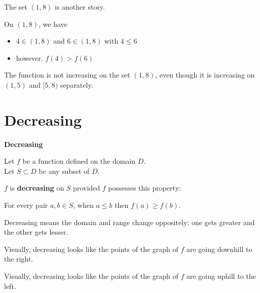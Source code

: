 \documentclass{ximera}
\begin{document}
The set $(1,8)$ is another story.


On $(1,8)$, we have 

\begin{itemize}
\item $4 \in (1,8)$  and  $6 \in (1,8)$  with $4 \leq 6$ \\

\item however, $f(4) > f(6)$
\end{itemize}


The function is not increasing on the set $(1,8)$, even though it is increasing on $(1,5)$ and $[5,8)$ separately. \\














\section{Decreasing}



\begin{definition} \textbf{\textcolor{green!50!black}{Decreasing}} 


Let $f$ be a function defined on the domain $D$. \\
Let $S \subset D$ be any subset of $D$.

$f$ is \textbf{decreasing} on $S$ provided $f$ possesses this property:  


\begin{center}
For every pair $a, b \in S$, when $a \leq b$ then $f(a) \geq f(b)$.
\end{center}

\end{definition}




\begin{idea}
Decreasing means the domain and range change oppositely: one gets greater and the other gets lesser.
\end{idea}


\begin{observation}
Visually, decreasing looks like the points of the graph of $f$ are going downhill to the right.
\end{observation}

\begin{observation}
Visually, decreasing looks like the points of the graph of $f$ are going uphill to the left.
\end{observation}
\end{document}

